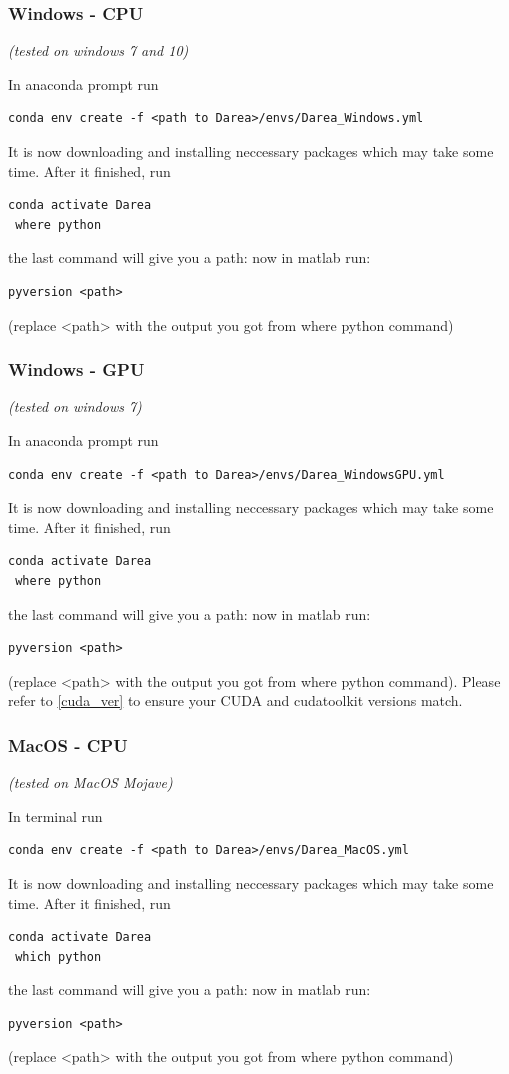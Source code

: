 \documentclass[12pt, a4paper]{scrartcl}
\begin{document}
\subsubsection{Windows - CPU}
\textit{(tested on windows 7 and 10)}

In anaconda prompt run
\begin{lstlisting}[belowskip=0pt]
 conda env create -f <path to Darea>/envs/Darea_Windows.yml
\end{lstlisting}
It is now downloading and installing neccessary packages which may take some time. After it finished, run
\begin{lstlisting}[belowskip=0pt]
 conda activate Darea
 where python
\end{lstlisting}
the last command will give you a path:
now in matlab run: 
\begin{lstlisting}[belowskip=0pt]
 pyversion <path> 
\end{lstlisting}

(replace <path> with the output you got from where python command)
\subsubsection{Windows - GPU}
\textit{(tested on windows 7)}

In anaconda prompt run
\begin{lstlisting}[belowskip=0pt]
 conda env create -f <path to Darea>/envs/Darea_WindowsGPU.yml
\end{lstlisting}
It is now downloading and installing neccessary packages which may take some time. After it finished, run
\begin{lstlisting}[belowskip=0pt]
 conda activate Darea
 where python
\end{lstlisting}
the last command will give you a path:
now in matlab run: 
\begin{lstlisting}[belowskip=0pt]
 pyversion <path> 
\end{lstlisting}
(replace <path> with the output you got from where python command).
Please refer to \ref{cuda_ver} to ensure your CUDA and cudatoolkit versions match.

\subsubsection{MacOS - CPU}
\textit{(tested on MacOS Mojave)}

In terminal run
\begin{lstlisting}[belowskip=0pt]
 conda env create -f <path to Darea>/envs/Darea_MacOS.yml
\end{lstlisting}
It is now downloading and installing neccessary packages which may take some time. After it finished, run
\begin{lstlisting}[belowskip=0pt]
 conda activate Darea
 which python
\end{lstlisting}
the last command will give you a path:
now in matlab run: 
\begin{lstlisting}[belowskip=0pt]
 pyversion <path> 
\end{lstlisting}
(replace <path> with the output you got from where python command)
\end{document}
